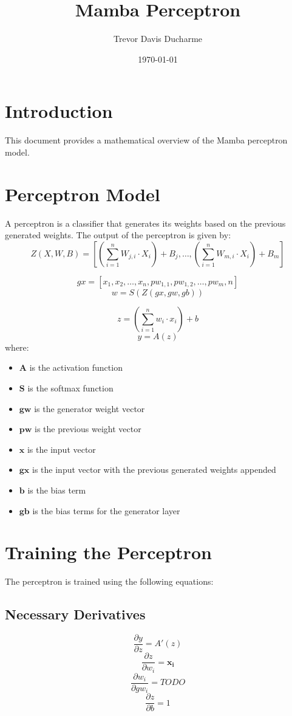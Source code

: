 \documentclass{article}
\title{Mamba Perceptron}
\author{Trevor Davis Ducharme}
\date{\today}
\begin{document}
\maketitle

\section{Introduction}
This document provides a mathematical overview of the Mamba perceptron model.

\section{Perceptron Model}
A perceptron is a classifier that generates its weights based on the previous generated weights.
 The output of the perceptron is given by:
\[
	Z(X,W,B)=\left[\left(\sum_{i=1}^{n} W_{j,i} \cdot X_i\right) + B_j, \ldots, \left(\sum_{i=1}^{n} W_{m,i} \cdot X_i\right) + B_m\right]
\]

\[
	gx = [x_1, x_2, \ldots, x_n, pw_{1,1}, pw_{1,2}, \ldots, pw_m,n]
\]
\[
	w=S(Z(gx, gw, gb))
\]

\[
	z = \left(\sum_{i=1}^{n} w_i \cdot x_i\right) + b
\]
\[
	y = A(z)
\]
where:
\begin{itemize}
	\item $\mathbf{A}$ is the activation function
	\item $\mathbf{S}$ is the softmax function
	\item $\mathbf{gw}$ is the generator weight vector
	\item $\mathbf{pw}$ is the previous weight vector
	\item $\mathbf{x}$ is the input vector
	\item $\mathbf{gx}$ is the input vector with the previous generated weights appended
	\item $\mathbf{b}$ is the bias term
	\item $\mathbf{gb}$ is the bias terms for the generator layer
\end{itemize}

\section{Training the Perceptron}
The perceptron is trained using the following equations:
\subsection{Necessary Derivatives}
\[
	\frac{\partial y}{\partial z} = A'(z)
\]
\[
	\frac{\partial z}{\partial w_i} = \mathbf{x_i}
\]
\[
	\frac{\partial w_i}{\partial gw_i} = TODO
\]
\[
	\frac{\partial z}{\partial b} = 1
\]
\end{document}
